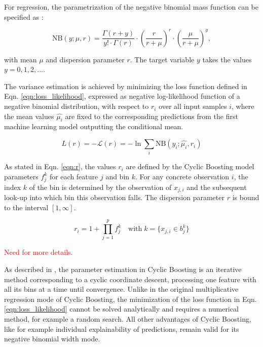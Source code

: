 \documentclass[BCOR=1mm, DIV=calc,10pt,
twoside=true,
twocolumn,
headings=normal]{scrartcl}
\newcommand{\eqn}{Eqn. }
\begin{document}
For regression, the parametrization of the negative binomial mass function can be specified as \cite{hilbe2011negative}:

\begin{equation} \label{eqn:nbinom}
\mathrm{NB}(y; \mu, r) = \frac{\Gamma(r + y)}{y! \cdot \Gamma(r)} \cdot \left(\frac{r}{r + \mu}\right)^r \cdot \left(\frac{\mu}{r + \mu}\right)^y,
\end{equation}

with mean $\mu$ and dispersion parameter $r$. The target variable $y$ takes the values $y = 0, 1, 2, ...$.

The variance estimation is achieved by minimizing the loss function defined in \eqn \eqref{eqn:loss_likelihood}, expressed as negative log-likelihood function of a negative binomial distribution, with respect to $r_i$ over all input samples $i$, where the mean values $\hat{\mu_i}$ are fixed to the corresponding predictions from the first machine learning model outputting the conditional mean.

\begin{equation} \label{eqn:loss_likelihood}
L(r) = -\mathcal{L}(r) = -\ln \sum_i \mathrm{NB}(y_i; \hat{\mu_i}, r_i)
\end{equation}

As stated in \eqn \eqref{eqn:r}, the values $r_i$ are defined by the Cyclic Boosting model parameters $f^k_j$ for each feature $j$ and bin $k$. For any concrete observation $i$, the index $k$ of the bin is determined by the observation of $x_{j,i}$ and the subsequent look-up into which bin this observation falls. The dispersion parameter $r$ is bound to the interval $[1, \infty]$.

\begin{equation} \label{eqn:r}
r_i = 1 + \prod \limits_{j=1}^p f^k_j \quad \text{with}\; k=\{ x_{j,i} \in b^k_j\}
\end{equation}

\textcolor{red}{Need for more details.}

As described in \cite{Wick2019}, the parameter estimation in Cyclic Boosting is an iterative method corresponding to a cyclic coordinate descent, processing one feature with all its bins at a time until convergence. Unlike in the original multiplicative regression mode of Cyclic Boosting, the minimization of the loss function in \eqn \eqref{eqn:loss_likelihood} cannot be solved analytically and requires a numerical method, for example a random search. All other advantages of Cyclic Boosting, like for example individual explainability of predictions, remain valid for its negative binomial width mode.
\end{document}
